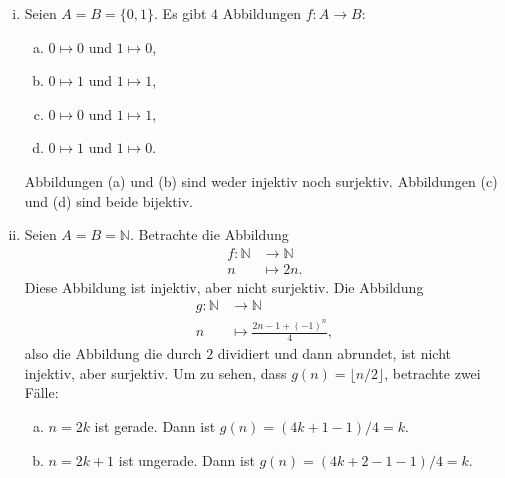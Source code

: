 \documentclass[../main.tex]{subfiles}
\begin{document}
\begin{example}\label{ex:inj-surj}
  \leavevmode
  \begin{enumerate}[(i)]
    \item Seien $A = B = \{0, 1\}$. Es gibt $4$ Abbildungen $f \colon A \rightarrow B$:
      \begin{enumerate}[(a)]
        \item $0 \mapsto 0$ und $1 \mapsto 0$,
        \item $0 \mapsto 1$ und $1 \mapsto 1$,
        \item $0 \mapsto 0$ und $1 \mapsto 1$,
        \item $0 \mapsto 1$ und $1 \mapsto 0$.
      \end{enumerate}
      Abbildungen (a) und (b) sind weder injektiv noch surjektiv. Abbildungen (c) und (d) sind
      beide bijektiv.
    \item Seien $A = B = \mathbb N$. Betrachte die Abbildung
      \begin{align*}
        f \colon \mathbb N &\to \mathbb N \\
        n &\mapsto 2n.
      \end{align*}
      Diese Abbildung ist injektiv, aber nicht surjektiv. Die Abbildung
      \begin{align*}
        g \colon \mathbb N &\to \mathbb N \\
            n &\mapsto \frac{2n - 1 + {(-1)}^{n}}{4},
      \end{align*}
      also die Abbildung die durch $2$ dividiert und dann abrundet, ist nicht injektiv,
      aber surjektiv. Um zu sehen, dass
      $g(n) = \lfloor{n/2}\rfloor$, betrachte zwei Fälle:
      \begin{enumerate}[(a)]
        \item $n = 2k$ ist gerade. Dann ist $g(n) = (4k+1-1)/4 = k$.
        \item $n = 2k + 1$ ist ungerade. Dann ist $g(n) = (4k + 2 -1 -1)/4 = k$.
      \end{enumerate}
  \end{enumerate}
\end{example}
\end{document}
